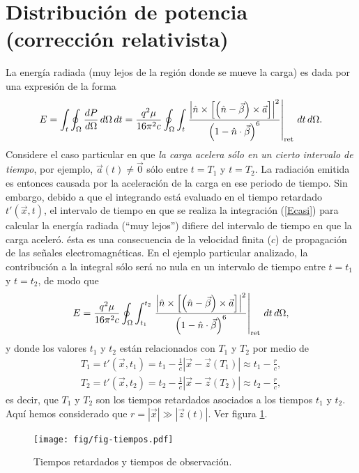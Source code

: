 
\section{Distribución de potencia (corrección relativista)}
La energía radiada (muy lejos de la región donde se mueve la carga) es dada por una expresión de la forma
\begin{equation}
 E=\int_t\oint_\Omega \frac{dP}{d\Omega}\,d\Omega\,dt=\frac{q^2\mu}{16\pi^2 c}\oint_\Omega\int_t\left.\frac{\left|\hat{n}\times
\left[ \left( \hat{n}-\vec{\beta}\right)\times{\vec{a}}\right]\right|^2}{\left(
1-\hat{n}\cdot\vec{\beta}\right) ^{6}}\right|_{\rm ret}\,dt\,d\Omega .
\end{equation}
Considere el caso particular en que \textit{la carga acelera sólo en un cierto intervalo de tiempo}, por ejemplo, $\vec{a}(t)\neq\vec{0}$ sólo entre $t=T_1$ y $t=T_2$. La radiación emitida es entonces causada por la aceleración de la carga en ese periodo de tiempo. Sin embargo, debido a que el integrando está evaluado en el tiempo retardado $t'(\vec{x},t)$, el intervalo de tiempo en que se realiza la integración (\ref{Ecasi}) para calcular la energía radiada  (``muy lejos'') difiere del intervalo de tiempo en que la carga aceleró. ésta es una consecuencia de la velocidad finita ($c$) de propagación de las señales electromagnéticas. En el ejemplo particular analizado, la contribución a la integral sólo será no nula en un intervalo de tiempo entre $t=t_1$ y $t=t_2$, de modo que
\begin{equation}
 E=\frac{q^2\mu}{16\pi^2 c}\oint_\Omega\int_{t_1}^{t_2}\left.\frac{\left|\hat{n}\times
\left[ \left( \hat{n}-\vec{\beta}\right)\times{\vec{a}}\right]\right|^2}{\left(
1-\hat{n}\cdot\vec{\beta}\right) ^{6}}\right|_{\rm ret}\,dt\,d\Omega , \label{Ecasi}
\end{equation}
y donde los valores $t_1$ y $t_2$ están relacionados con $T_1$ y $T_2$ por medio de
\begin{eqnarray}
T_1=t'(\vec{x},t_1)=t_1-\frac{1}{c}|\vec{x}-\vec{z}(T_1)|
\approx t_1-\frac{r}{c}, \\
T_2=t'(\vec{x},t_2)=t_2-\frac{1}{c}|\vec{x}-\vec{z}(T_2)|
\approx t_2-\frac{r}{c},
\end{eqnarray}
es decir, que $T_1$ y $T_2$ son los tiempos retardados asociados a los tiempos $t_1$ y $t_2$. Aquí hemos considerado que $r=|\vec{x}|\gg |\vec{z}(t)|$. Ver figura \ref{fig:tiempos}.
\begin{figure}[H]
\centerline{\texttt{[image: fig/fig-tiempos.pdf]}}
\caption{Tiempos retardados y tiempos de observación.}
\label{fig:tiempos}
\end{figure}

